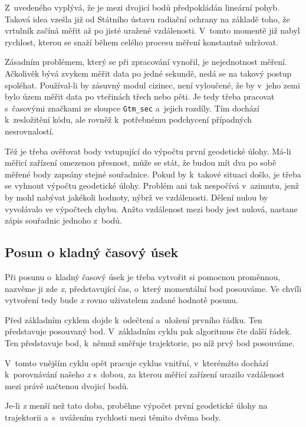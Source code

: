 Z~uvedeného vyplývá, že je mezi dvojicí bodů předpokládán lineární pohyb. Taková idea vzešla
již od Státního ústavu radiační ochrany na základě toho, že vrtulník začíná měřit
až po jisté uražené vzdálenosti. V~tomto momentě již nabyl rychlost, kterou se snaží během
celého procesu měření konstantně udržovat. 

Zásadním problémem, který se při zpracování vynořil, je nejednotnost měření.
Ačkolivěk bývá zvykem měřit data po jedné sekundě, nedá se na takový postup spoléhat.
Používal-li by zásuvný modul cizinec, není vyloučené, že by v~jeho zemi bylo územ měřit
data po vteřinách třech nebo pěti. Je tedy třeba pracovat s~časovými značkami ze sloupce
{\tt Gtm\_sec} a~jejich rozdíly. Tím dochází k~zesložitění kódu, ale rovněž k~potřebnému
podchycení případných nesrovnalostí. 

Též je třeba ověřovat body vstupující do výpočtu první geodetické úlohy. Má-li měřicí zařízení
omezenou přesnost, může se stát, že budou mít dva po sobě měřené body zapsány stejné souřadnice.
Pokud by k~takové situaci došlo, je třeba se vyhnout výpočtu geodetické úlohy. Problém ani
tak nespočívá v~azimutu, jenž by mohl nabývat jakékoli hodnoty, nýbrž ve vzdálenosti.
Dělení nulou by vyvolávalo ve výpočtech chybu. Anžto vzdálenost mezi body jest nulová,
nastane zápis souřadnic jednoho z~bodů. 

\subsection{Posun o kladný časový úsek}
\label{kladnycas}

Při posunu o~kladný časový úsek je třeba vytvořit si pomocnou proměnnou, nazvěme ji zde \textit{x},
představující čas, o~který momentální bod posouváme. Ve chvíli vytvoření tedy bude \textit{x}
rovno uživatelem zadané hodnotě posunu. 

Před základním cyklem dojde k~odečtení a~uložení prvního řádku. Ten představuje posouvaný bod.
V~základním cyklu pak algoritmus čte další řádek. Ten představuje bod, k~němuž směřuje
trajektorie, po níž prvý bod posouváme. 

V~tomto vnějším cyklu opět pracuje cyklus vnitřní, v~kterémžto dochází k~porov\-ná\-vá\-ní našeho
\textit{x} s~dobou, za kterou měřicí zařízení urazilo vzdálenost mezi právě načtenou dvojicí bodů. 

Je-li \textit{x} menší než tato doba, proběhne výpočet první geodetické úlohy na trajektorii
a~s~uvážením rychlosti mezi těmito dvěma body. 

